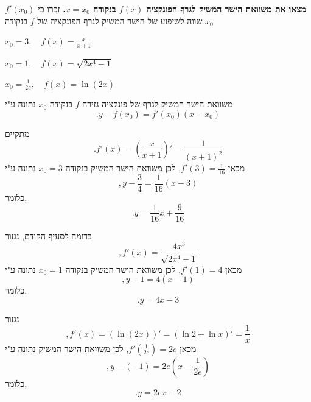 \textbf{מצאו את משוואת הישר המשיק לגרף הפונקציה \(f(x)\) בנקודה \(x = x_0\).}
זכרו כי
$f'(x_0)$
שווה לשיפוע של הישר המשיק לגרף הפונקציה של
$f$
בנקודה
$x_0$
\bE{}
\item$ x_0 = 3, \quad f(x) = \frac{x}{x+1}$
\item$ x_0 = 1, \quad f(x) = \sqrt{2x^4 - 1}$
\item$ x_0 = \frac{1}{2e}, \quad f(x) = \ln(2x)$
\eMs
\eE

\ifsol
\begin{solbox}
משוואת הישר המשיק לגרף של פונקציה גזירה
$f$
בנקודה
$x_0$
נתונה ע"י
$$.y-f(x_0)=f'(x_0)(x-x_0)$$
\bE
\item

מתקיים
$$.f'(x)=\left(\frac{x}{x+1}\right)'=\frac{1}{(x+1)^2}$$
מכאן
$f'(3)=\frac{1}{16}$,
לכן משוואת הישר המשיק בנקודה
$x_0=3$
נתונה ע"י
$$,y-\frac{3}{4}=\frac{1}{16}(x-3)$$
כלומר,
$$.y=\frac{1}{16}x+\frac{9}{16}$$
\item
בדומה לסעיף הקודם, נגזור
$$,f'(x)=\frac{4x^3}{\sqrt{2x^4-1}}$$
מכאן
$f'(1)=4$,
לכן משוואת הישר המשיק בנקודה
$x_0=1$
נתונה ע"י
$$,y-1=4(x-1)$$
כלומר,
$$.y=4x-3$$
\item
נגזור
$$,f'(x)=\left(\ln(2x)\right)'=\left(\ln2+\ln x\right)'=\frac{1}{x}$$
מכאן
$f'(\tfrac{1}{2e})=2e$,
לכן משוואת הישר המשיק נתונה ע"י
$$,y-(-1)=2e(x-\frac{1}{2e})$$
כלומר,
$$.y=2ex-2$$
\eE
\end{solbox}
\fi
